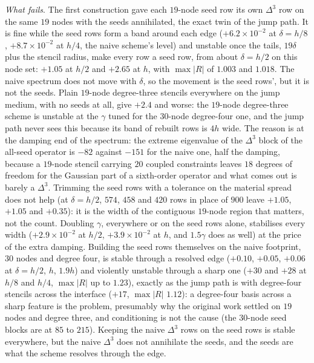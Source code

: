 \documentclass[11pt]{amsart}
\theoremstyle{definition}
\theoremstyle{remark}
\newcommand{\para}[1]{\par\smallskip\noindent\textit{#1}.\enspace}
\begin{document}
\para{What fails}
The first construction gave each $19$-node seed row its own $\Delta^3$
row on the same $19$ nodes with the seeds annihilated, the exact twin of
the jump path. It is fine while the seed rows form a band around each
edge ($+6.2 \times 10^{-2}$ at $\delta = h / 8$, $+8.7 \times 10^{-2}$ at
$h / 4$, the naive scheme's level) and unstable once the tails, $19\delta$
plus the stencil radius, make every row a seed row, from about
$\delta = h / 2$ on this node set: $+1.05$ at $h / 2$ and $+2.65$ at
$h$, with $\max |R|$ of $1.003$ and $1.018$. The naive spectrum does not
move with $\delta$, so the movement is the seed rows', but it is not the
seeds. Plain $19$-node degree-three stencils everywhere on the jump
medium, with no seeds at all, give $+2.4$ and worse: the $19$-node
degree-three scheme is unstable at the $\gamma$ tuned for the $30$-node
degree-four one, and the jump path never sees this because its band of
rebuilt rows is $4h$ wide. The reason is at the damping end of the spectrum: the extreme eigenvalue of the $\Delta^3$ block of the all-seed
operator is $-82$ against $-151$ for the naive one, half the damping,
because a $19$-node stencil carrying $20$ coupled constraints leaves $18$
degrees of freedom for the Gaussian part of a sixth-order operator and
what comes out is barely a $\Delta^3$. Trimming the seed rows with a
tolerance on the material spread does not help (at $\delta = h / 2$,
$574$, $458$ and $420$ rows in place of $900$ leave $+1.05$, $+1.05$ and
$+0.35$): it is the width of the contiguous $19$-node region that
matters, not the count. Doubling $\gamma$, everywhere or on the seed rows
alone, stabilises every width ($+2.9 \times 10^{-2}$ at $h / 2$,
$+3.9 \times 10^{-2}$ at $h$, and $1.5\gamma$ does as well) at the price
of the extra damping. Building the seed rows themselves on the naive
footprint, $30$ nodes and degree four, is stable through a resolved edge
($+0.10$, $+0.05$, $+0.06$ at $\delta = h / 2$, $h$, $1.9h$) and
violently unstable through a sharp one ($+30$ and $+28$ at $h / 8$ and
$h / 4$, $\max |R|$ up to $1.23$), exactly as the jump path is with
degree-four stencils across the interface ($+17$, $\max |R|$ $1.12$):
a degree-four basis across a sharp feature is the problem, presumably
why the original work settled on $19$ nodes and degree three, and
conditioning is not the cause (the $30$-node seed blocks are at $85$ to
$215$). Keeping the naive $\Delta^3$ rows on the seed rows is stable
everywhere, but the naive $\Delta^3$ does not annihilate the seeds, and
the seeds are what the scheme resolves through the edge.
\end{document}
